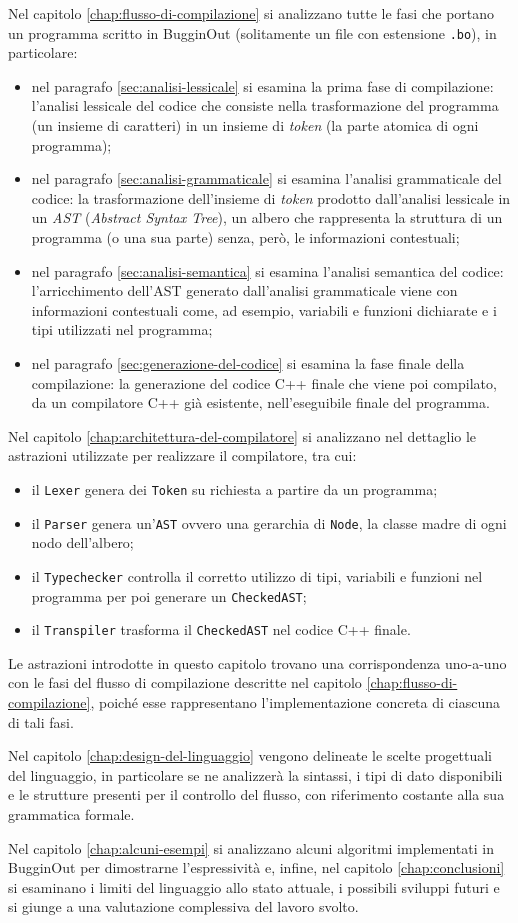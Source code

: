 Nel capitolo \ref{chap:flusso-di-compilazione} si analizzano tutte le fasi che portano un programma scritto in BugginOut (solitamente un file con estensione \texttt{.bo}), in particolare:
\begin{itemize}
	\item nel paragrafo \ref{sec:analisi-lessicale} si esamina la prima fase di compilazione: l'analisi lessicale del codice che consiste nella trasformazione del programma (un insieme di caratteri) in un insieme di \emph{token} (la parte atomica di ogni programma);
	\item nel paragrafo \ref{sec:analisi-grammaticale} si esamina l'analisi grammaticale del codice: la trasformazione dell'insieme di \emph{token} prodotto dall'analisi lessicale in un \emph{AST} (\textit{Abstract Syntax Tree}), un albero che rappresenta la struttura di un programma (o una sua parte) senza, per\`o, le informazioni contestuali;
	\item nel paragrafo \ref{sec:analisi-semantica} si esamina l'analisi semantica del codice: l'arricchimento dell'AST generato dall'analisi grammaticale viene con informazioni contestuali come, ad esempio, variabili e funzioni dichiarate e i tipi utilizzati nel programma;
	\item nel paragrafo \ref{sec:generazione-del-codice} si esamina la fase finale della compilazione: la generazione del codice C++ finale che viene poi compilato, da un compilatore C++ gi\`a esistente, nell'eseguibile finale del programma.
\end{itemize}
Nel capitolo \ref{chap:architettura-del-compilatore} si analizzano nel dettaglio le astrazioni utilizzate per realizzare il compilatore, tra cui:
\begin{itemize}
	\item il \texttt{Lexer} genera dei \texttt{Token} su richiesta a partire da un programma;
	\item il \texttt{Parser} genera un'\texttt{AST} ovvero una gerarchia di \texttt{Node}, la classe madre di ogni nodo dell'albero;
	\item il \texttt{Typechecker} controlla il corretto utilizzo di tipi, variabili e funzioni nel programma per poi generare un \texttt{CheckedAST};
	\item il \texttt{Transpiler} trasforma il \texttt{CheckedAST} nel codice C++ finale.
\end{itemize}
Le astrazioni introdotte in questo capitolo trovano una corrispondenza uno-a-uno con le fasi del flusso di compilazione descritte nel capitolo \ref{chap:flusso-di-compilazione}, poiché esse rappresentano l’implementazione concreta di ciascuna di tali fasi.

Nel capitolo \ref{chap:design-del-linguaggio} vengono delineate le scelte progettuali del linguaggio, in particolare se ne analizzer\`a la sintassi, i tipi di dato disponibili e le strutture presenti per il controllo del flusso, con riferimento costante alla sua grammatica formale.

Nel capitolo \ref{chap:alcuni-esempi} si analizzano alcuni algoritmi implementati in BugginOut per dimostrarne l'espressivit\`a e, infine, nel capitolo \ref{chap:conclusioni} si esaminano i limiti del linguaggio allo stato attuale, i possibili sviluppi futuri e si giunge a una valutazione complessiva del lavoro svolto.
